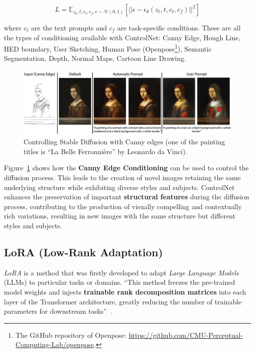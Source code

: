 \documentclass[preprint]{elsarticle}
\begin{document}
\begin{equation}
	L = \mathbb{E}_{z_0,t,c_t,c_f,\epsilon \sim \mathcal{N}(0,1)}\left[||\epsilon-\epsilon_\theta(z_t,t,c_t,c_f)||^2 \right]
\end{equation}

\noindent where $c_t$ are the text prompts and $c_f$ are task-specific conditions. These are all the types of conditioning available with ControlNet: Canny Edge, Hough Line, HED boundary, User Sketching, Human Pose (Openpose\footnote{The GitHub repository of Openpose: \url{https://github.com/CMU-Perceptual-Computing-Lab/openpose}.}), Semantic Segmentation, Depth, Normal Maps, Cartoon Line Drawing.


\begin{figure}[t]
	\centering
	\includegraphics[scale=0.8]{img/background_img/ControlnetDemo.png}
	\caption{Controlling Stable Diffusion with Canny edges (one of the painting titles is ``La Belle Ferronni{\`e}re'' by Leonardo da Vinci).}
	\label{fig:canny}
\end{figure}

Figure~\ref{fig:canny} shows how the \textbf{Canny Edge Conditioning} can be used to control the diffusion process.
This leads to the creation of novel images retaining the same underlying structure while exhibiting diverse styles and subjects.
ControlNet enhances the preservation of important \textbf{structural features} during the diffusion process, contributing to the production of visually compelling and contextually rich variations, resulting in new images with the same structure but different styles and subjects.



\subsection{LoRA (Low-Rank Adaptation)}\label{sect:lora}

\emph{LoRA} \cite{hu2021lora} is a method that was firstly developed to adapt 
\emph{Large Language Models} (LLMs) to particular tasks or domains.
``This method freezes  the pre-trained model weights and injects \textbf{trainable rank decomposition matrices}  into each layer of the Transformer architecture, greatly reducing the number of trainable 
parameters for downstream tasks''~\cite{hu2021lora}.
\end{document}
